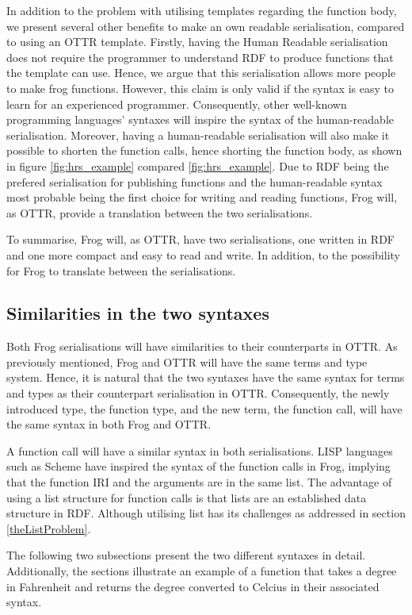 \para
In addition to the problem with utilising templates regarding the function body, we present several other benefits to make an own readable serialisation, compared to using an OTTR template. Firstly, having the Human Readable serialisation does not require the programmer to understand RDF to produce functions that the template can use. Hence, we argue that this serialisation allows more people to make frog functions. However, this claim is only valid if the syntax is easy to learn for an experienced programmer. Consequently, other well-known programming languages' syntaxes will inspire the syntax of the human-readable serialisation. Moreover, having a human-readable serialisation will also make it possible to shorten the function calls, hence shorting the function body, as shown in figure \ref{fig:hrs_example} compared \ref{fig:hrs_example}. Due to RDF being the prefered serialisation for publishing functions and the human-readable syntax most probable being the first choice for writing and reading functions, Frog will, as OTTR, provide a translation between the two serialisations. 

\para
To summarise, Frog will, as OTTR, have two serialisations, one written in RDF and one more compact and easy to read and write. In addition, to the possibility for Frog to translate between the serialisations.

\subsection{Similarities in the two syntaxes}
Both Frog serialisations will have similarities to their counterparts in OTTR. As previously mentioned, Frog and OTTR will have the same terms and type system. Hence, it is natural that the two syntaxes have the same syntax for terms and types as their counterpart serialisation in OTTR. Consequently, the newly introduced type, the function type, and the new term, the function call, will have the same syntax in both Frog and OTTR. 

\para 
A function call will have a similar syntax in both serialisations. LISP languages such as Scheme have inspired the syntax of the function calls in Frog, implying that the function IRI and the arguments are in the same list. The advantage of using a list structure for function calls is that lists are an established data structure in RDF. Although utilising list has its challenges as addressed in section \ref{theListProblem}.

\para 
The following two subsections present the two different syntaxes in detail. Additionally, the sections illustrate an example of a function that takes a degree in  Fahrenheit and returns the degree converted to Celcius in their associated syntax. 

